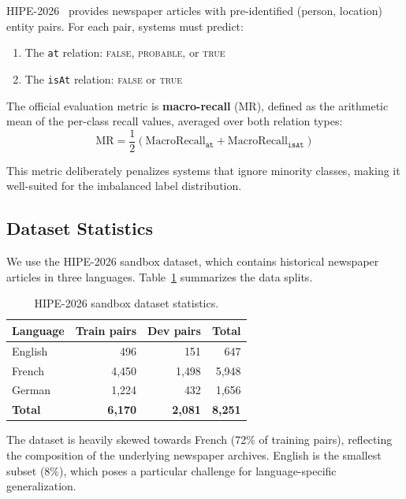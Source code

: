 \documentclass[11pt,a4paper]{article}
\begin{document}
HIPE-2026~\cite{opitz2026} provides newspaper articles with pre-identified (person, location) entity pairs. For each pair, systems must predict:
\begin{enumerate}
    \item The \texttt{at} relation: \textsc{false}, \textsc{probable}, or \textsc{true}
    \item The \texttt{isAt} relation: \textsc{false} or \textsc{true}
\end{enumerate}

The official evaluation metric is \textbf{macro-recall} (MR), defined as the arithmetic mean of the per-class recall values, averaged over both relation types:
\begin{equation}
    \text{MR} = \frac{1}{2}\left(\text{MacroRecall}_{\texttt{at}} + \text{MacroRecall}_{\texttt{isAt}}\right)
\end{equation}

This metric deliberately penalizes systems that ignore minority classes, making it well-suited for the imbalanced label distribution.

\subsection{Dataset Statistics}

We use the HIPE-2026 sandbox dataset, which contains historical newspaper articles in three languages. Table~\ref{tab:dataset} summarizes the data splits.

\begin{table}[t]
\centering
\caption{HIPE-2026 sandbox dataset statistics.}
\label{tab:dataset}
\begin{tabular}{lrrr}
\toprule
\textbf{Language} & \textbf{Train pairs} & \textbf{Dev pairs} & \textbf{Total} \\
\midrule
English & 496 & 151 & 647 \\
French & 4{,}450 & 1{,}498 & 5{,}948 \\
German & 1{,}224 & 432 & 1{,}656 \\
\midrule
\textbf{Total} & \textbf{6{,}170} & \textbf{2{,}081} & \textbf{8{,}251} \\
\bottomrule
\end{tabular}
\end{table}

The dataset is heavily skewed towards French (72\% of training pairs), reflecting the composition of the underlying newspaper archives. English is the smallest subset (8\%), which poses a particular challenge for language-specific generalization.
\end{document}
